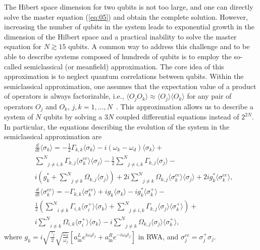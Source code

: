 \documentclass[lettersize,journal]{IEEEtran}
\begin{document}
The Hibert space dimension for two qubits is not too large, and one can directly solve the master equation (\ref{eq:05}) and obtain the complete solution.
However, increasing the number of qubits in the system leads to exponential growth in the dimension of the Hilbert space and a practical inability to solve the master equation for $N \gtrsim 15$ qubits.
A common way to address this challenge and to be able to describe systems composed of hundreds of qubits is to employ the so-called semiclassical (or meanfield) approximation. 
The core idea of this approximation is to neglect quantum correlations between qubits.
Within the semiclassical approximation, one assumes that the expectation value of a product of operators is always factorizable, i.e., $\langle O_j O_k \rangle \approx \langle O_j \rangle \langle O_k \rangle$ for any pair of operators $O_j$ and $O_k$, $j,k = 1, \ldots, N$~\cite{scully1999quantum, carmichael1999statistical}. 
This approximation allows us to describe a system of $N$ qubits by solving a $3N$ coupled differential equations instead of $2^{2N}$. 
In particular, the equations describing the evolution of the system in the semiclassical approximation are 
\begin{align} \label{eq:24}
&\frac{d}{dt} \langle {\sigma}_{k}\rangle  = -\frac{1}{2} {\Gamma}_{k,k} \langle {\sigma}_{k}\rangle  - i \left( {\omega}_{k} - \omega_{d} \right) \langle {\sigma}_{k}\rangle + \nonumber \\
&\underset{j{\ne}i,k}{\overset{N}{\sum}} {\Gamma}_{k,j}  \langle {\sigma}_{k}^{{ee}}\rangle   \langle {\sigma}_{j}\rangle  -\frac{1}{2} \underset{j{\ne}i,k}{\overset{N}{\sum}} {\Gamma}_{k,j}  \langle {\sigma}_{j}\rangle  - \\
&i \left( g^*_{k} + \underset{j{\ne}k}{\overset{N}{\sum}} {\Omega}_{k,j}  \langle {\sigma}_{j}\rangle  \right) + 2 i \underset{j{\ne}k}{\overset{N}{\sum}} {\Omega}_{k,j}  \langle {\sigma}_{k}^{{ee}}\rangle   \langle {\sigma}_{j}\rangle  + 2 i g^*_{k} \langle {\sigma}_{k}^{{ee}}\rangle, \nonumber  \\
&\frac{d}{dt} \langle {\sigma}_{k}^{{ee}}\rangle  = - {\Gamma}_{k,k} \langle {\sigma}_{k}^{{ee}}\rangle  +  i {g}_{k} \langle {\sigma}_{k}\rangle   - i g^*_{k} \langle {\sigma}_{k}^+\rangle - \nonumber \\
&\frac{1}{2} \left( \underset{i{\ne}k}{\overset{N}{\sum}} {\Gamma}_{i,k}  \langle {\sigma}_{i}^+\rangle   \langle {\sigma}_{k}\rangle  + \underset{j{\ne}i,k}{\overset{N}{\sum}} {\Gamma}_{k,j}  \langle {\sigma}_{j}\rangle   \langle {\sigma}_{k}^+\rangle  \right) + \\
&i \underset{i{\ne}k}{\overset{N}{\sum}} {\Omega}_{i,k}  \langle {\sigma}_{i}^+\rangle   \langle {\sigma}_{k}\rangle  - i \underset{j{\ne}k}{\overset{N}{\sum}} {\Omega}_{k,j}  \langle {\sigma}_{j}\rangle   \langle {\sigma}_{k}^+\rangle, \nonumber
\end{align}
where $g_k = i \sqrt{\frac{\gamma_j}{2}} \sqrt{\frac{\omega_d}{\omega_j}} \left[ a_\mathrm{in}^L e^{i \omega_d t_j} + a_\mathrm{in}^R e^{-i \omega_d t_j} \right]$ in RWA, and $\sigma_j^{ee} = \sigma_j^+ \sigma_j$.
\end{document}
